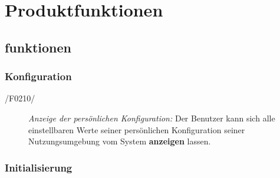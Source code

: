 \section{Produktfunktionen}


\subsection{funktionen}


\subsubsection{Konfiguration}

\begin{description}
  \item[/F0210/]
    \textit{Anzeige der persönlichen Konfiguration:}
    Der Benutzer kann sich alle einstellbaren Werte seiner persönlichen Konfiguration seiner Nutzungsumgebung vom System \textbf{anzeigen} lassen.
\end{description}



\subsubsection{Initialisierung}
